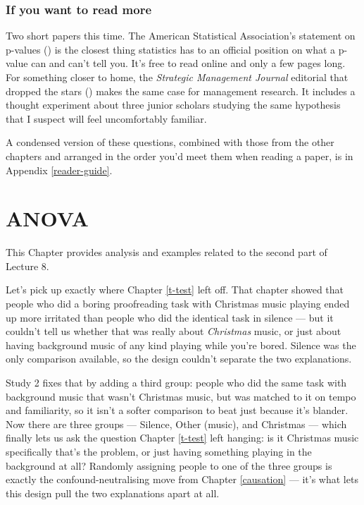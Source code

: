 \documentclass[
]{book}
\begin{document}
\subsection{If you want to read more}\label{if-you-want-to-read-more-7}

Two short papers this time. The American Statistical Association's statement on p-values () is the closest thing statistics has to an official position on what a p-value can and can't tell you. It's free to read online and only a few pages long. For something closer to home, the \emph{Strategic Management Journal} editorial that dropped the stars () makes the same case for management research. It includes a thought experiment about three junior scholars studying the same hypothesis that I suspect will feel uncomfortably familiar.

A condensed version of these questions, combined with those from the other chapters and arranged in the order you'd meet them when reading a paper, is in Appendix \ref{reader-guide}.

\chapter{ANOVA}\label{ANOVA}

This Chapter provides analysis and examples related to the second part of Lecture 8.

Let's pick up exactly where Chapter \ref{t-test} left off. That chapter showed that people who did a boring proofreading task with Christmas music playing ended up more irritated than people who did the identical task in silence --- but it couldn't tell us whether that was really about \emph{Christmas} music, or just about having background music of any kind playing while you're bored. Silence was the only comparison available, so the design couldn't separate the two explanations.

Study 2 fixes that by adding a third group: people who did the same task with background music that wasn't Christmas music, but was matched to it on tempo and familiarity, so it isn't a softer comparison to beat just because it's blander. Now there are three groups --- Silence, Other (music), and Christmas --- which finally lets us ask the question Chapter \ref{t-test} left hanging: is it Christmas music specifically that's the problem, or just having something playing in the background at all? Randomly assigning people to one of the three groups is exactly the confound-neutralising move from Chapter \ref{causation} --- it's what lets this design pull the two explanations apart at all.
\end{document}
